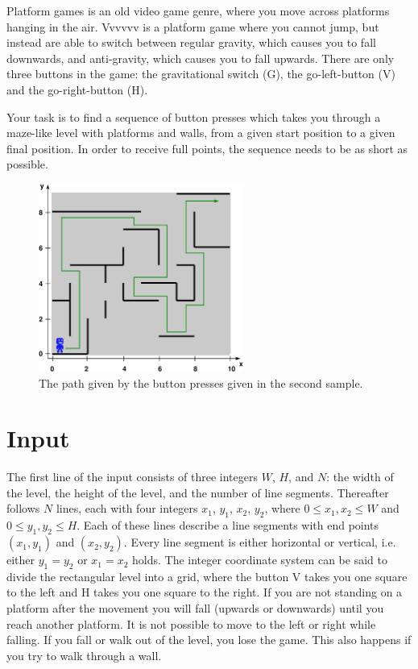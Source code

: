 Platform games is an old video game genre, where you move across platforms hanging in the air. Vvvvvv is a platform game where you cannot jump, but instead are able to switch between regular gravity, which causes you to fall downwards, and anti-gravity, which causes you to fall upwards. There are only three buttons in the game: the gravitational switch (G), the go-left-button (V) and the go-right-button (H).

Your task is to find a sequence of button presses which takes you through a maze-like level with platforms and walls, from a given start position to a given final position. In order to receive full points, the sequence needs to be as short as possible.

\begin{figure}[ht!]
\centering
\includegraphics[width=0.6\textwidth]{spelplan.pdf}
\caption{The path given by the button presses given in the second sample.}
\label{overflow}
\end{figure}

\section*{Input}
The first line of the input consists of three integers $W$, $H$, and $N$: the width of the level, the height of the level, and the number of line segments. Thereafter follows $N$ lines, each with four integers $x_1$, $y_1$, $x_2$, $y_2$, where $0 \le x_1, x_2 \le W$ and $0 \le y_1, y_2 \le H$. Each of these lines describe a line segments with end points $(x_1, y_1)$ and $(x_2, y_2)$. Every line segment is either horizontal or vertical, i.e. either $y_1=y_2$ or $x_1=x_2$ holds. The integer coordinate system can be said to divide the rectangular level into a grid, where the button V takes you one square to the left and H takes you one square to the right. If you are not standing on a platform after the movement you will fall (upwards or downwards) until you reach another platform. It is not possible to move to the left or right while falling. If you fall or walk out of the level, you lose the game. This also happens if you try to walk through a wall.

